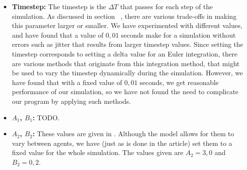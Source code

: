 \begin{itemize}
    \item \textbf{Timestep:} The timestep is the $\Delta T$ that passes for 
        each step of the simulation. As discussed in 
        section~ %
		, there are various trade-offs in making 
        this parameter larger or smaller. We have experimented with different 
        values, and have found that a value of $0,01$ seconds make for a 
        simulation without errors such as jitter that results from larger 
        timestep values. Since setting the timestep corresponds to setting a 
        delta value for an Euler integration, there are various methods that 
        originate from this integration method, that might be used to vary the 
        timestep dynamically during the simulation. However, we have found 
        that with a fixed value of $0,01$ seconds, we get reasonable 
        performance of our simulation, so we have not found the need to 
        complicate our program by applying such methods.

    \item \textbf{$A_1$, $B_1$:} TODO.

    \item \textbf{$A_2$, $B_2$:} These values are given in \cite{helbing00}. 
        Although the model allows for them to vary between agents, we have 
        (just as is done in the article) set them to a fixed value for the 
        whole simulation. The values given are $A_2=3,0$ and $B_2 = 0,2$.
\end{itemize}




